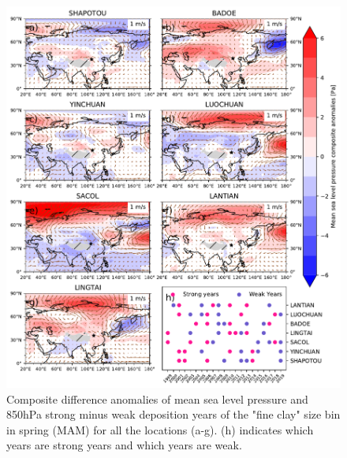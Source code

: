 \begin{figure}[htbp]
    \centering
    \includegraphics[width=\textwidth]{texfiles/figs/mslp_850hPa_2micron_MAM.pdf}
    \caption{Composite difference anomalies of mean sea level pressure and 850hPa strong minus weak deposition years of the "fine clay" size bin in spring (MAM) for all the locations (a-g).  (h) indicates which years are strong years and which years are weak.}
    \label{fig:MAM_850_fine_composite}
\end{figure}

